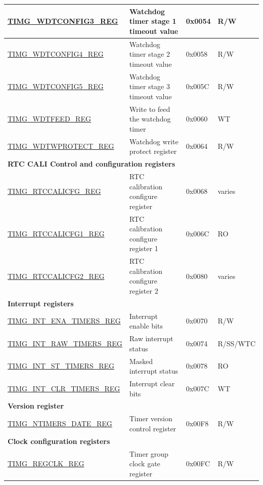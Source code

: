 \begin{longtable}{ | p{5.5cm} | p{7.5cm} | p{1.3cm} | p{1cm} | }
    \hyperref[regdesc:TIMGWDTCONFIG3REG]{TIMG\_WDTCONFIG3\_REG} & Watchdog timer stage 1 timeout value & 0x0054 & R/W \\ \hline
    \hyperref[regdesc:TIMGWDTCONFIG4REG]{TIMG\_WDTCONFIG4\_REG} & Watchdog timer stage 2 timeout value & 0x0058 & R/W \\ \hline
    \hyperref[regdesc:TIMGWDTCONFIG5REG]{TIMG\_WDTCONFIG5\_REG} & Watchdog timer stage 3 timeout value & 0x005C & R/W \\ \hline
    \hyperref[regdesc:TIMGWDTFEEDREG]{TIMG\_WDTFEED\_REG} & Write to feed the watchdog timer & 0x0060 & WT \\ \hline
    \hyperref[regdesc:TIMGWDTWPROTECTREG]{TIMG\_WDTWPROTECT\_REG} & Watchdog write protect register & 0x0064 & R/W \\ \hline
    \multicolumn{4}{|l|}{\textbf{RTC CALI Control and configuration registers}} \\ \hline
    \hyperref[regdesc:TIMGRTCCALICFGREG]{TIMG\_RTCCALICFG\_REG} & RTC calibration configure register & 0x0068 & varies \\ \hline
    \hyperref[regdesc:TIMGRTCCALICFG1REG]{TIMG\_RTCCALICFG1\_REG} & RTC calibration configure register 1 & 0x006C & RO \\ \hline
    \hyperref[regdesc:TIMGRTCCALICFG2REG]{TIMG\_RTCCALICFG2\_REG} & RTC calibration configure register 2 & 0x0080 & varies \\ \hline
    \multicolumn{4}{|l|}{\textbf{Interrupt registers}} \\ \hline
    \hyperref[regdesc:TIMGINTENATIMERSREG]{TIMG\_INT\_ENA\_TIMERS\_REG} & Interrupt enable bits & 0x0070 & R/W \\ \hline
    \hyperref[regdesc:TIMGINTRAWTIMERSREG]{TIMG\_INT\_RAW\_TIMERS\_REG} & Raw interrupt status & 0x0074 & R/SS/WTC \\ \hline
    \hyperref[regdesc:TIMGINTSTTIMERSREG]{TIMG\_INT\_ST\_TIMERS\_REG} & Masked interrupt status & 0x0078 & RO \\ \hline
    \hyperref[regdesc:TIMGINTCLRTIMERSREG]{TIMG\_INT\_CLR\_TIMERS\_REG} & Interrupt clear bits & 0x007C & WT \\ \hline
    \multicolumn{4}{|l|}{\textbf{Version register}} \\ \hline
    \hyperref[regdesc:TIMGNTIMERSDATEREG]{TIMG\_NTIMERS\_DATE\_REG} & Timer version control register & 0x00F8 & R/W \\ \hline
    \multicolumn{4}{|l|}{\textbf{Clock configuration registers}} \\ \hline
    \hyperref[regdesc:TIMGREGCLKREG]{TIMG\_REGCLK\_REG} & Timer group clock gate register & 0x00FC & R/W \\ \hline
    \end{longtable}
